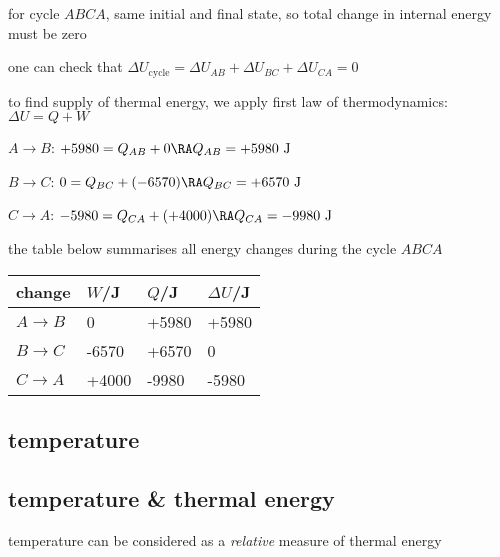 for cycle $ABCA$, same initial and final state, so total change in internal energy must be zero

one can check that $\Delta U_\text{cycle} = \Delta U_{AB} + \Delta U_{BC} + \Delta U_{CA} = 0$
	
\noindent to find supply of thermal energy, we apply first law of thermodynamics: $\Delta U = Q + W$

$A\to B$: $+5980 = Q_{AB} + 0 \RA Q_{AB} = +5980 \text{ J}$

$B \to C$: $0 = Q_{BC} + (-6570) \RA Q_{BC} = +6570 \text{ J}$

$C \to A$: $-5980 = Q_{CA} + (+4000) \RA Q_{CA} = -9980 \text{ J}$

\noindent the table below summarises all energy changes during the cycle $ABCA$
\begin{center}
		\begin{tabular}{|C{2.5cm}|C{2.5cm}|C{2.5cm}|C{2.5cm}|}
			\hline
			change &  $W$/J & $Q$/J & $\Delta U$/J \\ \hline
			$A \to B$ & 0 & +5980 & +5980\\ \hline
			$B \to C$ & -6570 & +6570 & 0 \\ \hline
			$C \to A$ & +4000 & -9980 & -5980 \\ \hline
		\end{tabular}
	
	\vspace*{-0.1\baselineskip}\eoe
\end{center}




\subsection{temperature}

\subsection{temperature \& thermal energy}

\cmt temperature can be considered as a \emph{relative} measure of thermal energy

